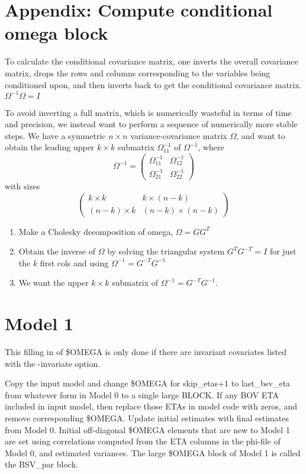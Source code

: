 \section{Appendix: Compute conditional omega block}
To calculate the conditional covariance matrix,
one inverts the overall covariance matrix,
drops the rows and columns corresponding to the variables being conditioned upon, and then inverts back to get the conditional covariance matrix.
\begin{math}
\Omega^{-1}\Omega = I
\end{math}

To avoid inverting a full matrix, which is numerically wasteful in terms of time and precision, we instead want to perform a sequence of numerically more stable steps.
We have a symmetric $n\times n$ variance-covariance matrix $\Omega$, and want to obtain the leading upper $k\times k$ submatrix $\Omega^{-1}_{11}$
of $\Omega^{-1}$, where
\[
\Omega^{-1} = \left( \begin{array}{cc}
\Omega^{-1}_{11} & \Omega^{-1}_{12}\\
\Omega^{-1}_{21} & \Omega^{-1}_{22}
\end{array} \right)
\] with sizes \[
\left(
\begin{array}{cc}
k\times k & k\times (n-k)\\
(n-k)\times k & (n-k)\times (n-k)
\end{array}
\right)
\]
\begin{enumerate}
\item Make a Cholesky decomposition of omega, $\Omega=GG^T$
\item Obtain the inverse of $\Omega$ by solving the triangular system $G^{T}G^{-T}=I$ for just the $k$ first cols and using $\Omega^{-1}=G^{-T}G^{-1}$
\item We want the upper $k\times k$ submatrix of $\Omega^{-1}=G^{-T}G^{-1}$.
\end{enumerate}




\section{Model 1}
This filling in of \$OMEGA is only done if there are invariant covariates listed with the -invariate option.

Copy the input model and change \$OMEGA for skip\_etas+1 to last\_bsv\_eta
from whatever form in Model 0 to a single large BLOCK. If any BOV ETA included in input model,
then replace those ETAs in model code with zeros, and remove corresponding \$OMEGA.
Update initial estimates with final estimates from Model 0.
Initial off-diagonal \$OMEGA elements that are new to Model 1 are set using
correlations computed from the ETA columns in the phi-file of Model 0, and estimated variances.
The large \$OMEGA block of Model 1 is called the BSV\_par block.

